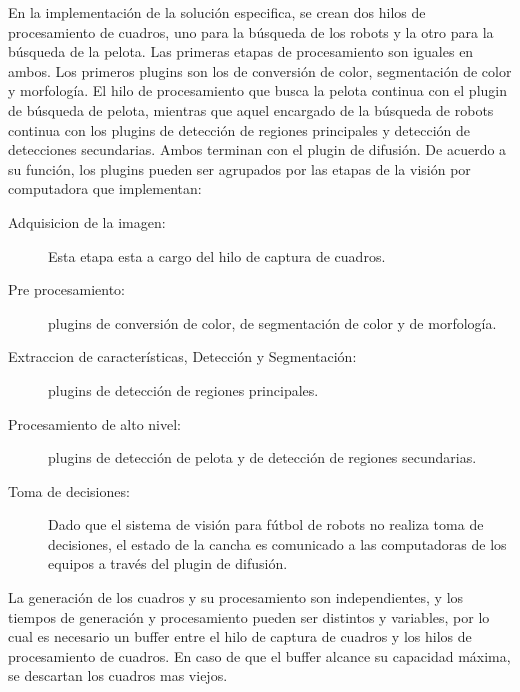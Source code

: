 En la implementación de la solución especifica, se crean dos hilos de
procesamiento de cuadros, uno para la búsqueda de los robots y la otro para la
búsqueda de la pelota. Las primeras etapas de procesamiento son iguales en
ambos. Los primeros plugins son los de conversión de color, segmentación de
color y morfología. El hilo de procesamiento que busca la pelota continua con el
plugin de búsqueda de pelota, mientras que aquel encargado de la búsqueda de
robots continua con los plugins de detección de regiones principales y detección
de detecciones secundarias. Ambos terminan con el plugin de difusión. De
acuerdo a su función, los plugins pueden ser agrupados por las etapas de la
visión por computadora que implementan:

\begin{description}

\item[Adquisicion de la imagen:] Esta etapa esta a cargo del hilo de captura de
	cuadros.

\item[Pre procesamiento:] plugins de conversión de color, de segmentación de
	color y de morfología.

\item[Extraccion de características, Detección y Segmentación:] plugins de
	detección de regiones principales.

\item[Procesamiento de alto nivel:] plugins de detección de pelota y de
	detección de regiones secundarias.

\item[Toma de decisiones:] Dado que el sistema de visión para fútbol de robots
	no realiza toma de decisiones, el estado de la cancha es comunicado a
	las computadoras de los equipos a través del plugin de difusión.

\end{description}

La generación de los cuadros y su procesamiento son independientes, y los
tiempos de generación y procesamiento pueden ser distintos y variables, por lo
cual es necesario un buffer entre el hilo de captura de cuadros y los hilos de
procesamiento de cuadros. En caso de que el buffer alcance su capacidad máxima,
se descartan los cuadros mas viejos.
